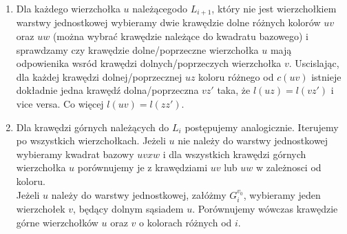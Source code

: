 \documentclass[12pt,a4paper,titlepage]{article}
\begin{document}
\begin{enumerate}
\item
Dla każdego wierzchołka $u$ należącegodo $L_{i+1}$, który nie jest wierzchołkiem warstwy jednostkowej wybieramy dwie krawędzie dolne różnych kolorów $uv$ oraz $uw$ (można wybrać krawędzie należące do kwadratu bazowego) i sprawdzamy czy krawędzie dolne/poprzeczne wierzchołka $u$ mają odpowienika wsród krawędzi dolnych/poprzeczych wierzchołka $v$. Uscislając, dla każdej krawędzi dolnej/poprzecznej $uz$ koloru różnego od $c(uv)$ istnieje dokładnie jedna krawędź dolna/poprzeczna $vz'$ taka, że $l(uz)=l(vz')$ i vice versa. Co więcej $l(uv)=l(zz')$.
\item
Dla krawędzi górnych należących do $L_i$ postępujemy analogicznie. Iterujemy po wszystkich wierzchołkach. Jeżeli $u$ nie należy do warstwy jednostkowej wybieramy kwadrat bazowy $uvxw$ i dla wszystkich krawędzi górnych wierzchołka $u$ porównujemy je z krawędziami $uv$ lub $uw$ w zależnosci od koloru.\\
Jeżeli $u$ należy do warstwy jednostkowej, załóżmy $G^{v_0}_i$, wybieramy jeden wierzchołek $v$, będący dolnym sąsiadem $u$. Porównujemy wówczas krawędzie górne wierzchołków $u$ oraz $v$ o kolorach różnych od $i$. 
\end{enumerate}
\end{document}
